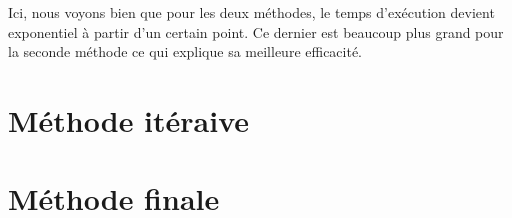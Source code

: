 \documentclass{article}
\newcommand{\code}[3]{}
\begin{document}
Ici, nous voyons bien que pour les deux méthodes, le temps d'exécution devient exponentiel à partir d'un certain point. Ce dernier est beaucoup plus grand pour la seconde méthode ce qui explique sa meilleure efficacité.

\begin{appendix}
\section{Méthode itéraive}
\code{1}{38}{Problem119_1.py}

\section{Méthode finale}
\code{1}{41}{Problem119_2.py}
\end{appendix}
\end{document}
